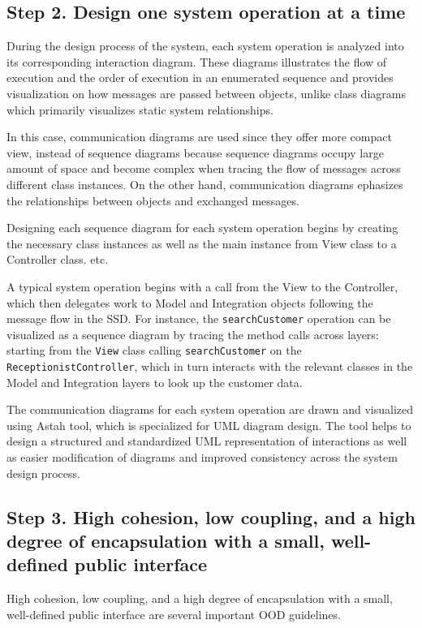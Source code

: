 \documentclass[a4paper]{scrartcl}
\begin{document}

\subsection{Step 2. Design one system operation at a time}
During the design process of the system, each system operation is analyzed into its corresponding interaction diagram. These diagrams illustrates the flow of execution and the order of execution in an enumerated sequence and provides visualization on how messages are passed between objects, unlike class diagrams which primarily visualizes static system relationships.

In this case, communication diagrams are used since they offer more compact view, instead of sequence diagrams because sequence diagrams occupy large amount of space and become complex when tracing the flow of messages across different class instances. On the other hand, communication diagrams ephasizes the relationships between objects and exchanged messages. 

Designing each sequence diagram for each system operation begins by creating the necessary class instances as well as the main instance from View class to a Controller class. etc.

A typical system operation begins with a call from the View to the Controller, which then delegates work to Model and Integration objects following the message flow in the SSD. For instance, the \texttt{searchCustomer} operation can be visualized as a sequence diagram by tracing the method calls across layers: starting from the \texttt{View} class calling \texttt{searchCustomer} on the \texttt{ReceptionistController}, which in turn interacts with the relevant classes in the Model and Integration layers to look up the customer data.


The communication diagrams for each system operation are drawn and visualized using Astah tool, which is specialized for UML diagram design. The tool helps to design a structured and standardized UML representation of interactions as well as easier modification of diagrams and improved consistency across the system design process.

\subsection{Step 3. High cohesion, low coupling, and a high degree of encapsulation with a small, well-defined public interface }
High cohesion, low coupling, and a high degree of encapsulation with a small, well-defined public interface are several important OOD guidelines.
\end{document}

